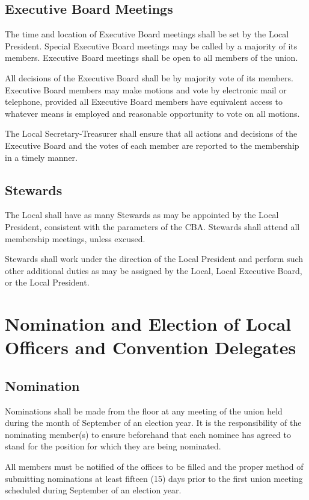\documentclass[11pt]{article}
\begin{document}
\subsection{Executive Board Meetings}
The time and location of Executive Board meetings shall be set by the Local President. Special Executive Board meetings may be called by a majority of its members. Executive Board meetings shall be open to all members of the union.

All decisions of the Executive Board shall be by majority vote of its members. Executive Board members may make motions and vote by electronic mail or telephone, provided all Executive Board members have equivalent access to whatever means is employed and reasonable opportunity to vote on all motions.

The Local Secretary-Treasurer shall ensure that all actions and decisions of the Executive Board and the votes of each member are reported to the membership in a timely manner.

\subsection{Stewards}
The Local shall have as many Stewards as may be appointed by the Local President, consistent with the parameters of the CBA. Stewards shall attend all membership meetings, unless excused.

Stewards shall work under the direction of the Local President and perform such other additional duties as may be assigned by the Local, Local Executive Board, or the Local President.

\section{Nomination and Election of Local Officers and Convention Delegates}
\subsection{Nomination}
Nominations shall be made from the floor at any meeting of the union held during the month of September of an election year. It is the responsibility of the nominating member(s) to ensure beforehand that each nominee has agreed to stand for the position for which they are being nominated.

All members must be notified of the offices to be filled and the proper method of submitting nominations at least fifteen (15) days prior to the first union meeting scheduled during September of an election year.
\end{document}
